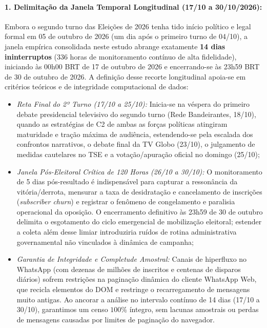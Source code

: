 \documentclass[12pt]{article}
\begin{document}
\paragraph{1. Delimitação da Janela Temporal Longitudinal (17/10 a 30/10/2026):}
Embora o segundo turno das Eleições de 2026 tenha tido início político e legal formal em 05 de outubro de 2026 (um dia após o primeiro turno de 04/10), a janela empírica consolidada neste estudo abrange exatamente \textbf{14 dias ininterruptos} (336 horas de monitoramento contínuo de alta fidelidade), iniciando às 00h00 BRT de 17 de outubro de 2026 e encerrando-se às 23h59 BRT de 30 de outubro de 2026. A definição desse recorte longitudinal apoia-se em critérios teóricos e de integridade computacional de dados:
\begin{itemize}
    \item \textit{Reta Final do 2º Turno (17/10 a 25/10):} Inicia-se na véspera do primeiro debate presidencial televisivo do segundo turno (Rede Bandeirantes, 18/10), quando as estratégias de C2 de ambas as forças políticas atingiram maturidade e tração máxima de audiência, estendendo-se pela escalada dos confrontos narrativos, o debate final da TV Globo (23/10), o julgamento de medidas cautelares no TSE e a votação/apuração oficial no domingo (25/10);
    \item \textit{Janela Pós-Eleitoral Crítica de 120 Horas (26/10 a 30/10):} O monitoramento de 5 dias pós-resultado é indispensável para capturar a ressonância da vitória/derrota, mensurar a taxa de desidratação e cancelamento de inscrições (\textit{subscriber churn}) e registrar o fenômeno de congelamento e paralisia operacional da oposição. O encerramento definitivo às 23h59 de 30 de outubro delimita o esgotamento do ciclo emergencial de mobilização eleitoral; estender a coleta além desse limiar introduziria ruídos de rotina administrativa governamental não vinculados à dinâmica de campanha;
    \item \textit{Garantia de Integridade e Completude Amostral:} Canais de hiperfluxo no WhatsApp (com dezenas de milhões de inscritos e centenas de disparos diários) sofrem restrições na paginação dinâmica do cliente WhatsApp Web, que recicla elementos do DOM e restringe o recarregamento de mensagens muito antigas. Ao ancorar a análise no intervalo contínuo de 14 dias (17/10 a 30/10), garantimos um censo $100\%$ íntegro, sem lacunas amostrais ou perdas de mensagens causadas por limites de paginação do navegador.
\end{itemize}
\end{document}
